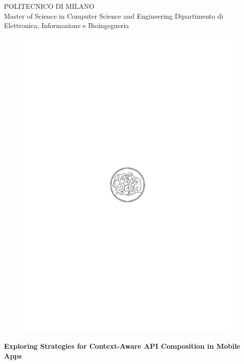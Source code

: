 \thispagestyle{empty}
\vspace*{-1.5cm} 

\bfseries{
\begin{center}

\large
POLITECNICO DI MILANO\\
\normalsize
Master of Science in Computer Science and Engineering
Dipartimento di Elettronica, Informazione e Bioingegneria
 
\vspace{10mm}

\begin{figure}[h]
\begin{center}
\includegraphics{logo_polimi.pdf}
\end{center}
\end{figure}

\vspace{1cm} 
\LARGE
\textbf{Exploring Strategies for Context-Aware API Composition in Mobile Apps}\\



\end{center}}
